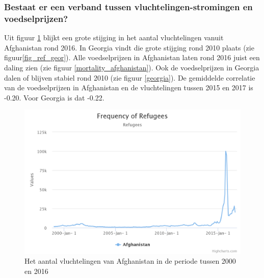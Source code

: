 \documentclass{article}
\begin{document}
\newpage
\subsubsection*{Bestaat er een verband tussen vluchtelingen-stromingen en voedselprijzen?}

Uit figuur \ref{fig_ref_afg} blijkt een grote stijging in het aantal vluchtelingen vanuit Afghanistan rond 2016. In Georgia vindt die grote stijging rond 2010 plaats (zie figuur\ref{fig_ref_geor}). Alle voedselprijzen in Afghanistan laten rond 2016 juist een daling zien (zie figuur \ref{mortality_afghanistan}). Ook de voedselprijzen in Georgia dalen of blijven stabiel rond 2010  (zie figuur \ref{georgia}). De gemiddelde correlatie van de voedselprijzen in Afghanistan en de vluchtelingen tussen 2015 en 2017 is -0.20. Voor Georgia is dat  -0.22.


\begin{figure}[h!]
    \centering
    \includegraphics[scale=0.3]{images/refugees_1.png}
    \caption{Het aantal vluchtelingen van Afghanistan in de periode tussen 2000 en 2016 }
    \label{fig_ref_afg}
    \medskip
    \small
    \end{figure}
\end{document}
